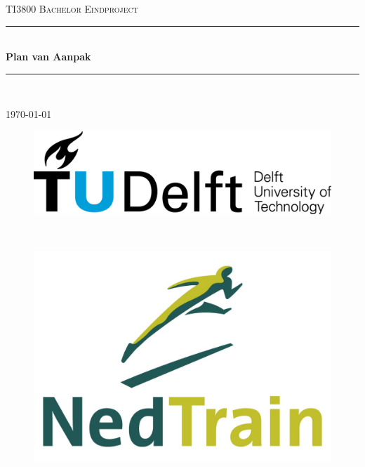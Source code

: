 \documentclass[a4paper]{article}
\makeatletter
\newcommand{\specialcell}[2][c]{\begin{tabular}[#1]{@{}c@{}}#2\end{tabular}}
\newcommand{\HRule}{\rule{\linewidth}{0.5mm}}
\makeatother
\begin{document}
\begin{titlepage}
\center
\textsc{\huge TI3800 Bachelor Eindproject}\\[1.5cm]
\HRule \\[0.4cm]
{\Huge \bfseries Plan van Aanpak}\\[0.4cm]
\HRule \\[1.5cm]

{\large \today}\\[2cm]

\begin{figure}[b]
\centering
\begin{minipage}{0.4\textwidth}
\begin{flushleft}
\includegraphics[width=0.9\linewidth]{images/TU_Delft_logo.png}
\end{flushleft}
\end{minipage}
~
\begin{minipage}{0.4\textwidth}
\begin{flushright}
\includegraphics[width=0.9\linewidth]{images/NedTrain_logo.png}
\end{flushright}
\end{minipage}\\[2cm]
\end{figure}

\vfill

\end{titlepage}
\end{document}
